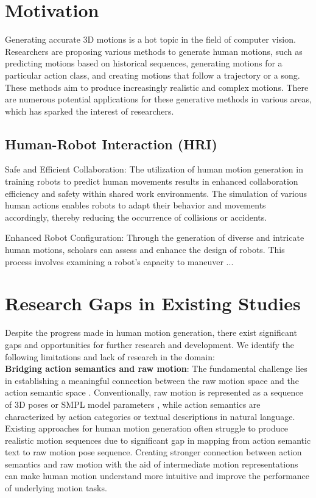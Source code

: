 \section{Motivation}
Generating accurate 3D motions is a hot topic in the field of computer vision. Researchers are proposing various methods to generate human motions, such as predicting motions based on historical sequences, generating motions for a particular action class, and creating motions that follow a trajectory or a song. These methods aim to produce increasingly realistic and complex motions. There are numerous potential applications for these generative methods in various areas, which has sparked the interest of researchers.\\

\subsection{Human-Robot Interaction (HRI)}

\noindent
Safe and Efficient Collaboration: The utilization of human motion generation in training robots to predict human movements results in enhanced collaboration efficiency and safety within shared work environments. The simulation of various human actions enables robots to adapt their behavior and movements accordingly, thereby reducing the occurrence of collisions or accidents.

\noindent
Enhanced Robot Configuration: Through the generation of diverse and intricate human motions, scholars can assess and enhance the design of robots. This process involves examining a robot's capacity to maneuver ...


\section{Research Gaps in Existing Studies}
Despite the progress made in human motion generation, there exist significant gaps and opportunities for further research and development. We identify the following limitations and lack of research in the domain:\\

\noindent
\textbf{Bridging action semantics and raw motion}: The fundamental challenge lies in establishing a meaningful connection between the raw motion space and the action semantic space \cite{dummy}. Conventionally, raw motion is represented as a sequence of 3D poses \cite{dummy} or SMPL model parameters \cite{dummy}, while action semantics are characterized by action categories or textual descriptions in natural language. Existing approaches for human motion generation often struggle to produce realistic motion sequences due to significant gap in mapping from action semantic text to raw motion pose sequence. Creating stronger connection between action semantics and raw motion with the aid of intermediate motion representations can make human motion understand more intuitive and improve the performance of underlying motion tasks. \\

